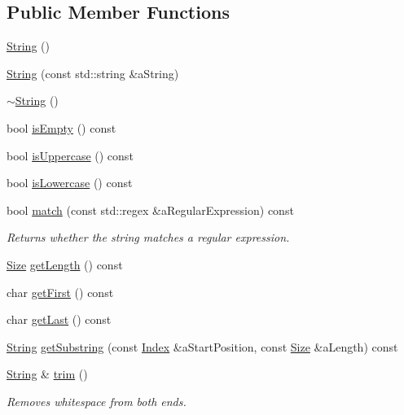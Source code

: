 \subsection*{Public Member Functions}
\begin{DoxyCompactItemize}
\item 
\hyperlink{classlibrary_1_1core_1_1types_1_1_string_ab49dec039a75f0049c95759141b6d484}{String} ()
\item 
\hyperlink{classlibrary_1_1core_1_1types_1_1_string_a37c737528805786c49eab397ba7b64ae}{String} (const std\+::string \&a\+String)
\item 
\hyperlink{classlibrary_1_1core_1_1types_1_1_string_a97f9b0024a58372a0281b25e2811f3bf}{$\sim$\+String} ()
\item 
bool \hyperlink{classlibrary_1_1core_1_1types_1_1_string_a1981fee5619389b46c786afa7aadc251}{is\+Empty} () const
\item 
bool \hyperlink{classlibrary_1_1core_1_1types_1_1_string_a6d12c373b22a062cfa0270204fc998f5}{is\+Uppercase} () const
\item 
bool \hyperlink{classlibrary_1_1core_1_1types_1_1_string_a3620d335dd5b14029a3a67e75c79be81}{is\+Lowercase} () const
\item 
bool \hyperlink{classlibrary_1_1core_1_1types_1_1_string_abab50e9c0d620b246d0bfde0dad0add5}{match} (const std\+::regex \&a\+Regular\+Expression) const
\begin{DoxyCompactList}\small\item\em Returns whether the string matches a regular expression. \end{DoxyCompactList}\item 
\hyperlink{namespacelibrary_1_1core_1_1types_a701626ea1027888ebbb8cfd0ff7adab0}{Size} \hyperlink{classlibrary_1_1core_1_1types_1_1_string_adc97f82ccc9a3d034bc3127e643199fb}{get\+Length} () const
\item 
char \hyperlink{classlibrary_1_1core_1_1types_1_1_string_ad695264b765448ecf4f8617553012eee}{get\+First} () const
\item 
char \hyperlink{classlibrary_1_1core_1_1types_1_1_string_aae3aaf5e3b3fde3f7b90fd1ee431c9d4}{get\+Last} () const
\item 
\hyperlink{classlibrary_1_1core_1_1types_1_1_string}{String} \hyperlink{classlibrary_1_1core_1_1types_1_1_string_aaf9377048b900766d05a1af9182cf251}{get\+Substring} (const \hyperlink{namespacelibrary_1_1core_1_1types_ad87eeb821d7067ec94e06ed1980d6350}{Index} \&a\+Start\+Position, const \hyperlink{namespacelibrary_1_1core_1_1types_a701626ea1027888ebbb8cfd0ff7adab0}{Size} \&a\+Length) const
\item 
\hyperlink{classlibrary_1_1core_1_1types_1_1_string}{String} \& \hyperlink{classlibrary_1_1core_1_1types_1_1_string_a42426ffb11bb0b2789ba0991064a01b5}{trim} ()
\begin{DoxyCompactList}\small\item\em Removes whitespace from both ends. \end{DoxyCompactList}\end{DoxyCompactItemize}
